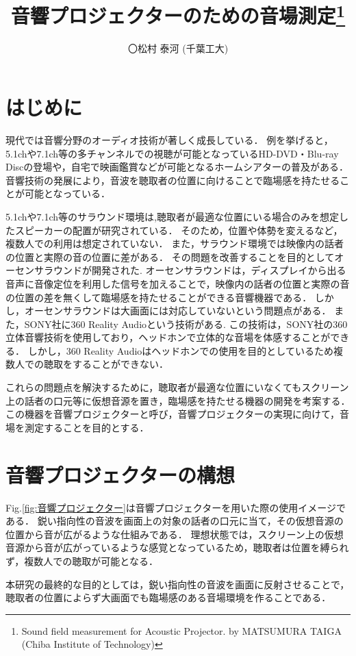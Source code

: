 \documentclass[twocolumn,11pt,a4j]{ltjsarticle}
\title{音響プロジェクターのための音場測定\thanks{Sound field measurement for Acoustic Projector. by MATSUMURA TAIGA (Chiba Institute of Technology)}
}
\author{〇松村 泰河 (千葉工大)}
\date{}
\begin{document}
\maketitle


\section{はじめに}
現代では音響分野のオーディオ技術が著しく成長している\cite{yamamoto2006}．
例を挙げると，5.1chや7.1ch等の多チャンネルでの視聴が可能となっているHD-DVD・Blu-ray Discの登場や，自宅で映画鑑賞などが可能となるホームシアターの普及がある．
音響技術の発展により，音波を聴取者の位置に向けることで臨場感を持たせることが可能となっている．

5.1chや7.1ch等のサラウンド環境は,聴取者が最適な位置にいる場合のみを想定したスピーカーの配置が研究されている\cite{kurosumi1994}．
そのため，位置や体勢を変えるなど，複数人での利用は想定されていない．
また，サラウンド環境では映像内の話者の位置と実際の音の位置に差がある．
その問題を改善することを目的としてオーセンサラウンドが開発された\cite{authensurround}.
オーセンサラウンドは，ディスプレイから出る音声に音像定位を利用した信号を加えることで，映像内の話者の位置と実際の音の位置の差を無くして臨場感を持たせることができる音響機器である．
しかし，オーセンサラウンドは大画面には対応していないという問題点がある．
また，SONY社に360 Reality Audioという技術がある\cite{360RealityAudio}.
この技術は，SONY社の360立体音響技術を使用しており，ヘッドホンで立体的な音場を体感することができる．
しかし，360 Reality Audioはヘッドホンでの使用を目的としているため複数人での聴取をすることができない．


これらの問題点を解決するために，聴取者が最適な位置にいなくてもスクリーン上の話者の口元等に仮想音源を置き，臨場感を持たせる機器の開発を考案する．
この機器を音響プロジェクターと呼び，音響プロジェクターの実現に向けて，音場を測定することを目的とする．

\section{音響プロジェクターの構想}
Fig.\ref{fig:音響プロジェクター}は音響プロジェクターを用いた際の使用イメージである．
鋭い指向性の音波を画面上の対象の話者の口元に当て，その仮想音源の位置から音が広がるような仕組みである．
理想状態では，スクリーン上の仮想音源から音が広がっているような感覚となっているため，聴取者は位置を縛られず，複数人での聴取が可能となる．

本研究の最終的な目的としては，鋭い指向性の音波を画面に反射させることで，聴取者の位置によらず大画面でも臨場感のある音場環境を作ることである．
\end{document}
